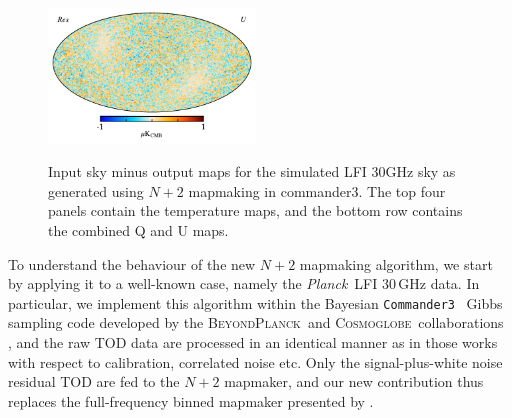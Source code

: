 \documentclass{aa}
\def\commanderthree{\texttt{Commander3}}
\newcommand{\BP}{\textsc{BeyondPlanck}}
\newcommand{\cosmoglobe}{\textsc{Cosmoglobe}}
\def\Planck{\textit{Planck}}
\begin{document}
\begin{figure}
  \includegraphics[width=0.49\textwidth]{figs/sim_diff_U.pdf}\\
  \caption{Input sky minus output maps for the simulated LFI 30GHz sky as generated using $N+2$ mapmaking in commander3. The top four panels contain the temperature maps, and the bottom row contains the combined Q and U maps.}
  \label{fig:sim_diff}
\end{figure}








To understand the behaviour of the new $N+2$ mapmaking algorithm, we start by applying it to a well-known case, namely the \Planck\ LFI 30\,GHz data. In particular, we implement this algorithm within the Bayesian \commanderthree\ \citep{bp03} Gibbs sampling code developed by the \BP\ and \cosmoglobe\ collaborations \citep{bp01, watts2023_dr1}, and the raw TOD data are processed in an identical manner as in those works with respect to calibration, correlated noise etc. Only the signal-plus-white noise residual TOD are fed to the $N+2$ mapmaker, and our new contribution thus replaces the full-frequency binned mapmaker presented by \citet{BP10}. 
\end{document}

